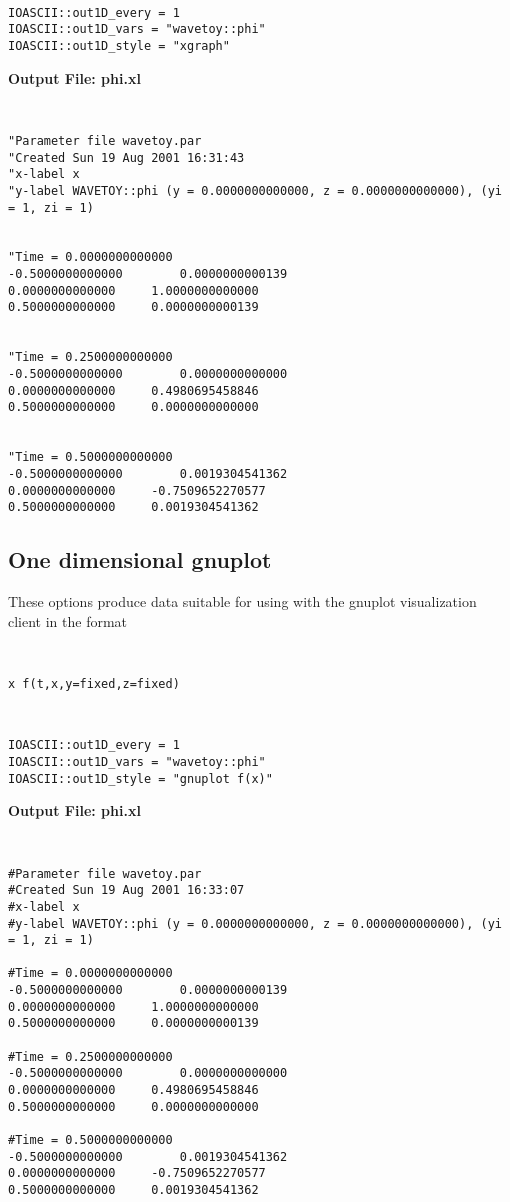 \documentclass{article}
\begin{document}
{\tt
\begin{verbatim}
IOASCII::out1D_every = 1
IOASCII::out1D_vars = "wavetoy::phi"
IOASCII::out1D_style = "xgraph"
\end{verbatim}
}

\noindent
{\bf Output File: phi.xl}

{\tt
\begin{verbatim}
"Parameter file wavetoy.par
"Created Sun 19 Aug 2001 16:31:43
"x-label x
"y-label WAVETOY::phi (y = 0.0000000000000, z = 0.0000000000000), (yi = 1, zi = 1) 


"Time = 0.0000000000000
-0.5000000000000		0.0000000000139
0.0000000000000		1.0000000000000
0.5000000000000		0.0000000000139


"Time = 0.2500000000000
-0.5000000000000		0.0000000000000
0.0000000000000		0.4980695458846
0.5000000000000		0.0000000000000


"Time = 0.5000000000000
-0.5000000000000		0.0019304541362
0.0000000000000		-0.7509652270577
0.5000000000000		0.0019304541362
\end{verbatim}
}

\subsection{One dimensional gnuplot}

These options produce data suitable for using with the gnuplot visualization client in the format
{\tt
\begin{verbatim}
x f(t,x,y=fixed,z=fixed)
\end{verbatim}
}


{\tt
\begin{verbatim}
IOASCII::out1D_every = 1
IOASCII::out1D_vars = "wavetoy::phi"
IOASCII::out1D_style = "gnuplot f(x)"
\end{verbatim}
}

\noindent
{\bf Output File: phi.xl}

{\tt
\begin{verbatim}
#Parameter file wavetoy.par
#Created Sun 19 Aug 2001 16:33:07
#x-label x
#y-label WAVETOY::phi (y = 0.0000000000000, z = 0.0000000000000), (yi = 1, zi = 1) 

#Time = 0.0000000000000
-0.5000000000000		0.0000000000139
0.0000000000000		1.0000000000000
0.5000000000000		0.0000000000139

#Time = 0.2500000000000
-0.5000000000000		0.0000000000000
0.0000000000000		0.4980695458846
0.5000000000000		0.0000000000000

#Time = 0.5000000000000
-0.5000000000000		0.0019304541362
0.0000000000000		-0.7509652270577
0.5000000000000		0.0019304541362
\end{verbatim}
}
\end{document}
